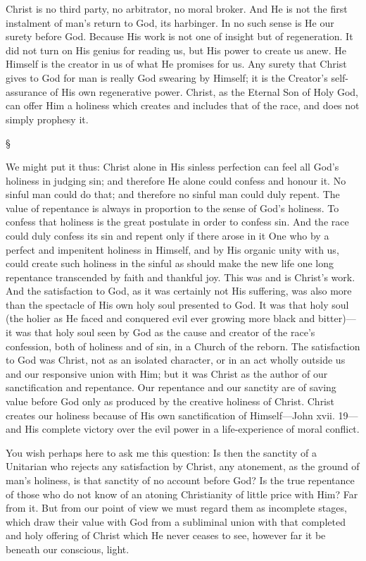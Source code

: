 \documentclass[12pt,a5paper,twoside,titlepage]{book}
\begin{document}
Christ is no third party, no arbitrator, no 
moral broker. And He is not the first instalment 
of man's return to God, its harbinger. In 
no such sense is He our surety before God. 
Because His work is not one of insight but 
of regeneration. It did not turn on His genius 
for reading us, but His power to create us 
anew. He Himself is the creator in us of 
what He promises for us. Any surety that 
Christ gives to God for man is really God swearing 
by Himself; it is the Creator's self-assurance 
of His own regenerative power. Christ, as the 
Eternal Son of Holy God, can offer Him a holiness 
which creates and includes that of the race, 
and does not simply prophesy it. 

\begin{center}
\S
\end{center}

We might put it thus: Christ alone in His 
sinless perfection can feel all God's holiness in 
judging sin; and therefore He alone could 
confess and honour it. No sinful man could do 
that; and therefore no sinful man could duly 
repent. The value of repentance is always in 
proportion to the sense of God's holiness. To 
confess that holiness is the great postulate in 
order to confess sin. And the race could duly 
confess its sin and repent only if there arose in it 
One who by a perfect and impenitent holiness in 
Himself, and by His organic unity with us, could 
create such holiness in the sinful as should make 
the new life one long repentance transcended by 
faith and thankful joy. This was and is Christ's 
work. And the satisfaction to God, as it was 
certainly not His suffering, was also more than 
the spectacle of His own holy soul presented to 
God. It was that holy soul (the holier as He 
faced and conquered evil ever growing more 
black and bitter)---it was that holy soul seen 
by God as the cause and creator of the race's 
confession, both of holiness and of sin, in a 
Church of the reborn. The satisfaction to God 
was Christ, not as an isolated character, or in 
an act wholly outside us and our responsive 
union with Him; but it was Christ as the 
author of our sanctification and repentance. 
Our repentance and our sanctity are of saving 
value before God only as produced by the creative 
holiness of Christ. Christ creates our holiness 
because of His own sanctification of Himself---John 
xvii. 19---and His complete victory over 
the evil power in a life-experience of moral 
conflict. 

You wish perhaps here to ask me this question: 
Is then the sanctity of a Unitarian who rejects 
any satisfaction by Christ, any atonement, as the 
ground of man's holiness, is that sanctity of no 
account before God? Is the true repentance of 
those who do not know of an atoning Christianity 
of little price with Him? Far from it. But from 
our point of view we must regard them as incomplete 
stages, which draw their value with 
God from a subliminal union with that completed 
and holy offering of Christ which He never ceases 
to see, however far it be beneath our conscious, 
light. 
\end{document}
